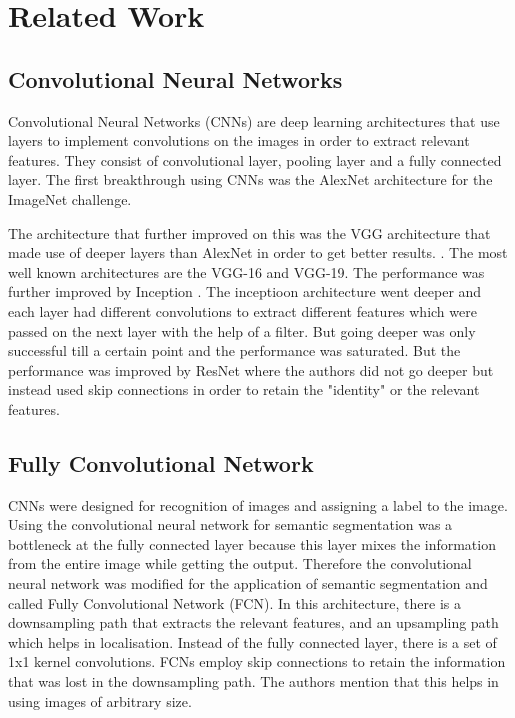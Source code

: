 \documentclass[rnd]{mas_proposal}
\begin{document}
\section{Related Work}
\subsection{Convolutional Neural Networks}
Convolutional Neural Networks (CNNs) are deep learning architectures that use layers to implement convolutions on the images in order to extract relevant features. They consist of convolutional layer, pooling layer and a fully connected layer. The first breakthrough using CNNs was the AlexNet architecture \cite{alex-net} for the ImageNet challenge. 

The architecture that further improved on this was the VGG architecture that made use of deeper layers than AlexNet in order to get better results. \cite{VGG}. The most well known architectures are the VGG-16 and VGG-19. The performance was further improved by Inception \cite{Inception}. The inceptioon architecture went deeper and each layer had different convolutions to extract different features which were passed on the next layer with the help of a filter. But going deeper was only successful till a certain point and the performance was saturated. But the performance was improved by ResNet \cite{Res-Net} where the authors did not go deeper but instead used skip connections in order to retain the "identity" or the relevant features. 




\subsection{Fully Convolutional Network}
CNNs were designed for recognition of images and assigning a label to the image. Using the convolutional neural network for semantic segmentation was a bottleneck at the fully connected layer because this layer mixes the information from the entire image while getting the output. Therefore the convolutional neural network was modified for the application of semantic segmentation and called Fully Convolutional Network (FCN).\cite{FCN-long} In this architecture, there is a downsampling path that extracts the relevant features, and an upsampling path which helps in localisation. Instead of the fully connected layer, there is a set of 1x1 kernel convolutions. FCNs employ skip connections to retain the information that was lost in the downsampling path. The authors mention that this helps in using images of arbitrary size. 
\end{document}
